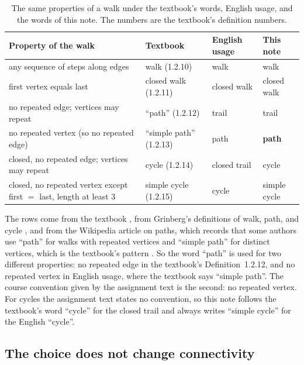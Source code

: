 \begin{table}[ht]
\centering
\caption{The same properties of a walk under the textbook's words, English usage, and the words of this note. The numbers are the textbook's definition numbers.}\label{tab:conventions}
\begin{tabular}{>{\raggedright\arraybackslash}p{4.6cm}>{\raggedright\arraybackslash}p{3.3cm}>{\raggedright\arraybackslash}p{3cm}l}
\toprule
Property of the walk & Textbook & English usage & This note\\
\midrule
any sequence of steps along edges & walk (1.2.10) & walk & walk\\
first vertex equals last & closed walk (1.2.11) & closed walk & closed walk\\
no repeated edge; vertices may repeat & ``path'' (1.2.12) & trail & trail\\
no repeated vertex (so no repeated edge) & ``simple path'' (1.2.13) & path & \textbf{path}\\
closed, no repeated edge; vertices may repeat & cycle (1.2.14) & closed trail & cycle\\
closed, no repeated vertex except first $=$ last, length at least $3$ & simple cycle (1.2.15) & cycle & simple cycle\\
\bottomrule
\end{tabular}
\end{table}

The rows come from the textbook \cite[pp.~21--22]{petrosyan2015grafneri}, from Grinberg's definitions of walk, path, and cycle \cite{grinberg2025graph}, and from the Wikipedia article on paths, which records that some authors use ``path'' for walks with repeated vertices and ``simple path'' for distinct vertices, which is the textbook's pattern \cite{wikipedia_path_graph_theory}.
So the word ``path'' is used for two different properties: no repeated edge in the textbook's Definition~1.2.12, and no repeated vertex in English usage, where the textbook says ``simple path''.
The course convention given by the assignment text is the second: no repeated vertex.
For cycles the assignment text states no convention, so this note follows the textbook's word ``cycle'' for the closed trail and always writes ``simple cycle'' for the English ``cycle''.

\subsection{The choice does not change connectivity}\label{sec:choice}

